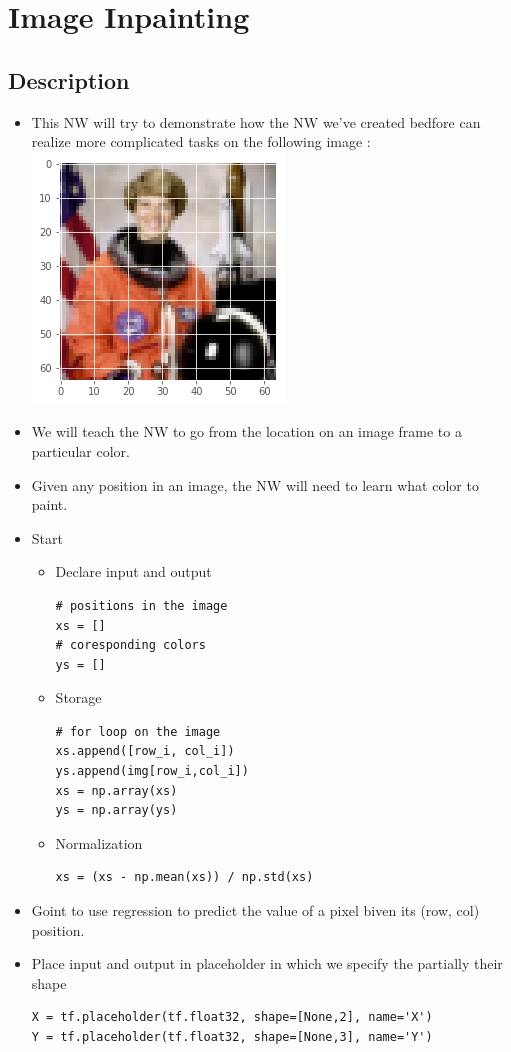 \documentclass[12pt,a4paper]{article}
\begin{document}
\section{Image Inpainting}
\subsection{Description}
\begin{itemize}
\item This NW will try to demonstrate how the NW we've created bedfore can realize more complicated tasks on the following image :\\
\includegraphics[scale=0.3]{inPainting}
\item We will teach the NW to go from the location on an image frame to a particular color.
\item Given any position in an image, the NW will need to learn what color to paint.
\item Start
\begin{itemize}
\item Declare input and output
\begin{lstlisting}
# positions in the image
xs = []
# coresponding colors
ys = []
\end{lstlisting}
\item Storage
\begin{lstlisting}
# for loop on the image
xs.append([row_i, col_i])
ys.append(img[row_i,col_i])
xs = np.array(xs)
ys = np.array(ys)
\end{lstlisting}
\item Normalization
\begin{lstlisting}
xs = (xs - np.mean(xs)) / np.std(xs)
\end{lstlisting}
\end{itemize}
\item Goint to use regression to predict the value of a pixel biven its (row, col) position.
\item Place input and output in placeholder in which we specify the partially their shape
\begin{lstlisting}
X = tf.placeholder(tf.float32, shape=[None,2], name='X')
Y = tf.placeholder(tf.float32, shape=[None,3], name='Y')
\end{lstlisting}
\end{itemize}
\end{document}
